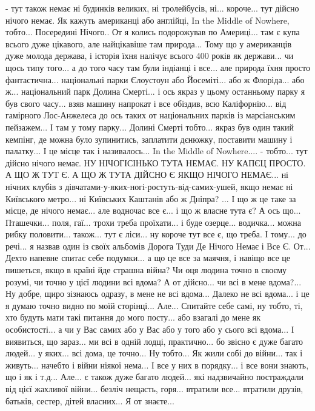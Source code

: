- тут також немає ні будинків великих, ні тролейбусів, ні...
короче... тут дійсно нічого немає. Як кажуть американці або англійці, In the Middle of Nowhere, тобто... Посередині Нічого.. От я колись подорожував по Америці... там є купа всього дуже цікавого, але найцікавіше там природа... Тому що у американців дуже молода держава, і історія їхня налічує всього 400 років як держави... чи щось типу того... а до того часу там були індіанці і все... але природа їхня просто фантастична... національні парки Єлоустоун або Йосеміті... або ж Флоріда... або ж... національний парк Долина Смерті... і ось якраз у цьому останньому парку я був свого часу... взяв машину напрокат і все обїздив, всю Каліфорнію... від гамірного Лос-Анжелеса до ось таких от національних парків із марсіанським пейзажем... І там у тому парку... Долині Смерті тобто... якраз був один такий кемпінг, де можна було зупинитись, заплатити дєнюжку, поставити машину і палатку... І це місце так і називалось... In the Middle of Nowhere.... 
- тобто... тут дійсно нічого немає. НУ НІЧОГІСІНЬКО ТУТА НЕМАЄ. НУ КАПЄЦ ПРОСТО.
А ЩО Ж ТУТ Є. А ЩО Ж ТУТА ДІЙСНО Є ЯКЩО НІЧОГО НЕМАЄ... ні нічних клубів з дівчатами-у-яких-ногі-ростуть-від-самих-ушей, якщо немає ні Київського метро... ні Київських Каштанів або ж Дніпра? ... І що ж це таке за місце, де нічого немає... але водночас все є... і що ж власне тута є?
А ось що... Пташечки... поля, гаї... трохи треба проїхати... і буде озерце... водичка... можна рибку половити... також... тут є ліси...
ну короче тут все є, що треба. І тому... до речі... я назвав один із своїх альбомів Дорога Туди Де Нічого Немає і Все Є.
От... Дехто напевне спитає себе подумки... а що це все за маячня, і навіщо все це пишеться, якщо в країні йде страшна війна? Чи оця людина точно в своєму розумі, чи точно у цієї людини всі вдома? А от дійсно... чи всі в мене вдома?... 
Ну добре, щиро зізнаюсь одразу, в мене не всі вдома... Далеко не всі вдома... і це я думаю точно видно по моїй сторінці... Але...
Спитайте себе самі, ну тобто, ті, хто будуть мати такі питання до мого посту... або взагалі до мене як особистості... а чи у Вас самих або у Вас або у того або у сього всі вдома... І виявиться, що зараз... ми всі в одній лодці, практично... бо звісно є дуже багато людей... у яких... всі дома, це точно... Ну тобто... Як жили собі до війни... так і живуть... начебто і війни ніякої нема... І все у них в порядку... і все вони знають, що і як і т.д... Але... є також дуже багато людей... які надзвичайно постраждали від цієї жахливої війни... безліч нещасть, горя... втратили все... втратили друзів, батьків, сестер, дітей власних... Я от знаєте...
